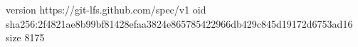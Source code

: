 version https://git-lfs.github.com/spec/v1
oid sha256:2f4821ae8b99bf81428efaa3824e865785422966db429c845d19172d6753ad16
size 8175
